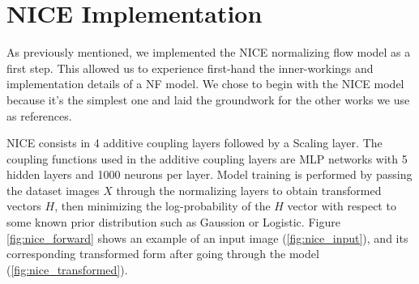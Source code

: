\section{NICE Implementation}

As previously mentioned, we implemented the NICE\cite{nice} normalizing
flow model as a first step. This allowed us to experience first-hand the
inner-workings and implementation details of a NF model. We chose to begin with
the NICE model because it's the simplest one and laid the groundwork for the
other works we use as references. 

NICE consists in 4 additive coupling layers followed by a Scaling layer. The
coupling functions used in the additive coupling layers are MLP networks with 5
hidden layers and 1000 neurons per layer. Model training is performed by passing
the dataset images $X$ through the normalizing layers to obtain transformed
vectors $H$, then minimizing the log-probability of the $H$ vector with respect
to some known prior distribution such as Gaussion or Logistic. Figure
\ref{fig:nice_forward} shows an example of an input image
(\ref{fig:nice_input}), and its corresponding transformed form after going
through the model (\ref{fig:nice_transformed}).

